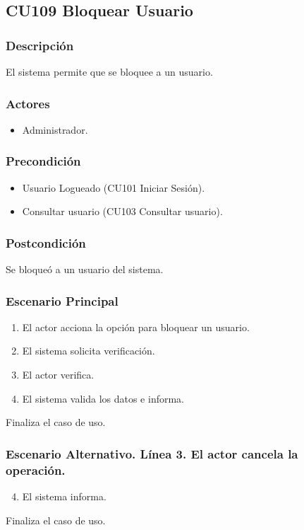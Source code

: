 \subsection{CU109 Bloquear Usuario}
\subsubsection{Descripci\'{o}n}
El sistema permite que se bloquee a un usuario.
\subsubsection{Actores}
\begin{itemize}
\item Administrador.
\end{itemize}
\subsubsection{Precondici\'{o}n}
\begin{itemize}
\item Usuario Logueado (CU101 Iniciar Sesi\'{o}n).
\item Consultar usuario (CU103 Consultar usuario).
\end{itemize}
\subsubsection{Postcondici\'{o}n}
Se bloque\'{o} a un usuario del sistema.
\subsubsection{Escenario Principal}
\begin{enumerate}
\item El actor acciona la opci\'{o}n para bloquear un usuario.
\item El sistema solicita verificaci\'{o}n.
\item El actor verifica.
\item El sistema valida los datos e informa.
\end{enumerate}
Finaliza el caso de uso.
\subsubsection{Escenario Alternativo. L\'{i}nea 3. El actor cancela la operaci\'{o}n.}
\begin{enumerate}
\setcounter{enumi}{3}
\item El sistema informa.
\end{enumerate}
Finaliza el caso de uso.